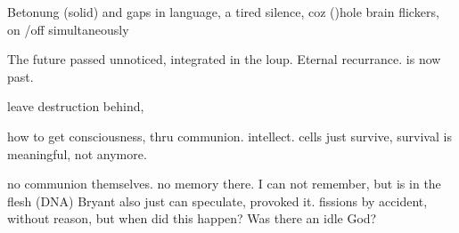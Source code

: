 \documentclass{article}
\begin{document}
Betonung (solid) and gaps in language, 
a tired silence, coz ()hole
brain flickers, on /off simultaneously




The future passed unnoticed, 
integrated in the loup.
Eternal recurrance. 
is now past. 

leave destruction behind, 

how to get consciousness, thru communion. intellect.
cells just survive, 
survival is meaningful, not anymore. 

no communion themselves.
no memory there. 
I can not remember, but is in the flesh (DNA)
Bryant also just can speculate, provoked it.
fissions by accident, without reason,
but when did this happen?
Was there an idle God?
\end{document}
